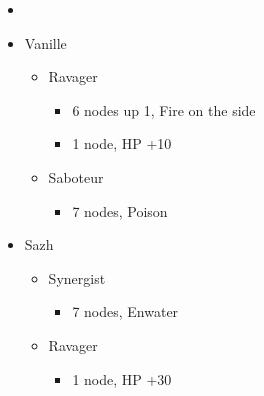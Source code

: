\begin{menu}
  \begin{multicols}{2}
    \begin{itemize}
      \paradigm
      \begin{itemize}
        \item {}%
              {\paradigmline{\rav}{\com}{}}%
              {\paradigmline[2]{\textit{(\sab)}}{\textit{(\syn)}}{}}%
              {\paradigmline{\sab}{\syn}{}}%
              {\paradigmline{\rav}{\rav}{}}%
              {\paradigmline{[\sab]}{(\rav)}{}}%
              {\paradigmline{[\sab]}{\com}{}}
      \end{itemize}
      \columnbreak
      \crystarium
      \begin{itemize}
        \item Vanille
              \begin{itemize}
                \item Ravager
                      \begin{itemize}
                        \item 6 nodes up 1, Fire on the side
                        \item 1 node, HP +10
                      \end{itemize}
                \item Saboteur
                      \begin{itemize}
                        \item 7 nodes, Poison
                      \end{itemize}
              \end{itemize}
        \item Sazh
              \begin{itemize}
                \item Synergist
                      \begin{itemize}
                        \item 7 nodes, Enwater
                      \end{itemize}
                \item Ravager
                      \begin{itemize}
                        \item 1 node, HP +30
                      \end{itemize}
              \end{itemize}
      \end{itemize}

\end{itemize}
\end{multicols}
\end{menu}
